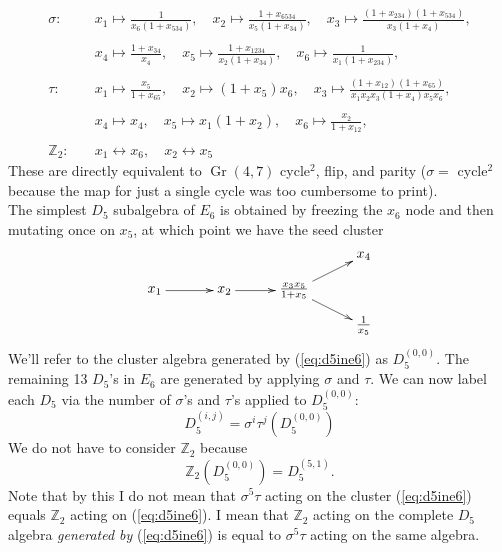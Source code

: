 \documentclass[12pt]{article}
\DeclareMathOperator{\Gr}{Gr}
\def\d5{D_5}
\def\e6{E_6}
\begin{document}
\begin{align*}
	\sigma:\quad &x_1\mapsto \frac{1}{x_6
   \left(1+x_{534}\right)}, \quad x_2\mapsto \frac{1+x_{6534}}{x_5
   \left(1+x_{34}\right)}, \quad x_3\mapsto
   \frac{\left(1+x_{234}\right)
   \left(1+x_{534}\right)}{x_3
   \left(1+x_4\right)},\\ \\ 
   &x_4\mapsto
   \frac{1+x_{34}}{x_4}, \quad x_5\mapsto \frac{1+x_{1234}}{x_2
   \left(1+x_{34}\right)}, \quad x_6\mapsto \frac{1}{x_1
   \left(1+x_{234}\right)},\\ \\
   \tau: \quad&x_1\mapsto \frac{x_5}{1+x_{65}},\quad x_2\mapsto
   \left(1+x_5\right) x_6,\quad x_3\mapsto
   \frac{\left(1+x_{12}\right)
   \left(1+x_{65}\right)}{x_1 x_2 x_3 \left(1+x_4\right)
   x_5 x_6},\\ \\ 
   &x_4\mapsto x_4,\quad x_5\mapsto x_1
   \left(1+x_2\right),\quad x_6\mapsto
   \frac{x_2}{1+x_{12}},\\ \\
   \mathbb{Z}_2:\quad &x_1 \leftrightarrow x_6, \quad x_2 \leftrightarrow x_5
\end{align*}
These are directly equivalent to $\Gr(4,7)$ cycle$^2$, flip, and parity ($\sigma = $ cycle$^2$ because the map for just a single cycle was too cumbersome to print).\\ 

The simplest $\d5$ subalgebra of $\e6$ is obtained by freezing the $x_6$ node and then mutating once on $x_5$, at which point we have the seed cluster
\begin{equation}\label{eq:d5ine6}
\begin{gathered}
\begin{xy} 0;<1pt,0pt>:<0pt,-1pt>::
	(0,25) *+{x_1} ="1",
	(50,25) *+{x_2} ="2",
	(100,25) *+{\frac{x_3 x_5}{1+x_5}} ="3",
	(150,0) *+{x_4} ="4",
	(150,50) *+{\frac{1}{x_5}} ="5",
	"1", {\ar"2"},
	"2", {\ar"3"},
	"3", {\ar"4"},
	"3", {\ar"5"},
\end{xy}
\end{gathered}
\end{equation}
We'll refer to the cluster algebra generated by (\ref{eq:d5ine6}) as $\d5^{(0,0)}$. The remaining 13 $\d5$'s in $\e6$ are generated by applying $\sigma$ and $\tau$. We can now label each $\d5$ via the number of $\sigma$'s and $\tau$'s applied to $\d5^{(0,0)}$:
\begin{equation}
	\d5^{(i,j)} = \sigma^{i}\tau^j(\d5^{(0,0)})
\end{equation}
We do not have to consider $\mathbb{Z}_2$ because 
\begin{equation}
	\mathbb{Z}_2(\d5^{(0,0)}) = \d5^{(5,1)}.
\end{equation}
Note that by this I do not mean that $\sigma^5\tau$ acting on the cluster (\ref{eq:d5ine6}) equals $\mathbb{Z}_2$ acting on (\ref{eq:d5ine6}). I mean that $\mathbb{Z}_2$ acting on the complete $D_5$ algebra \emph{generated by} (\ref{eq:d5ine6}) is equal to $\sigma^5\tau$ acting on the same algebra. \\
\end{document}
